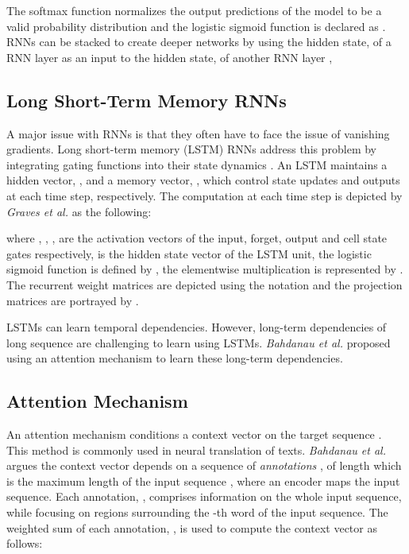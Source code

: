 \documentclass[preprint,12pt,3p]{elsarticle}
\begin{document}
The softmax function normalizes the output predictions of the model to be a valid probability distribution and the logistic sigmoid function is declared as . RNNs can be stacked to create deeper networks by using the hidden state,   of a RNN layer  as an input to the hidden state,  of another RNN layer , 


\subsection{Long Short-Term Memory RNNs}
\def\x{{\mathbf x}}

A major issue with RNNs is that they often have to face the issue of vanishing gradients. Long short-term memory (LSTM) RNNs address this problem by integrating gating functions into their state dynamics \cite{hochreiter1997long}. An LSTM maintains a hidden vector, , and a memory vector, , which control state updates and outputs at each time step, respectively.  The computation at each time step is depicted by \textit{Graves et al.} \cite{graves2012supervised} as the following:

where \textbf{}, \textbf{}, \textbf{}, \textbf{} are the activation vectors of the input, forget, output and cell state gates respectively,  is the hidden state vector of the LSTM unit, the logistic sigmoid function is defined by , the elementwise multiplication is represented by . The recurrent weight matrices are depicted using the notation  and the projection matrices are portrayed by .

LSTMs can learn temporal dependencies. However, long-term dependencies of long sequence are challenging to learn using LSTMs. \textit{Bahdanau et al.} \cite{bahdanau2014neural} proposed using an attention mechanism to learn these long-term dependencies. 

\subsection{Attention Mechanism}
An attention mechanism conditions a context vector  on the target sequence . This method is commonly used in neural translation of texts. \textit{Bahdanau et al.}\cite{bahdanau2014neural} argues the context vector  depends on a sequence of \textit{annotations} , of length  which is the maximum length of the input sequence , where an encoder maps the input sequence. Each annotation, , comprises information on the whole input sequence, while focusing on regions surrounding the -th word of the input sequence. The weighted sum of each annotation, , is used to compute the context vector as follows:
\end{document}
